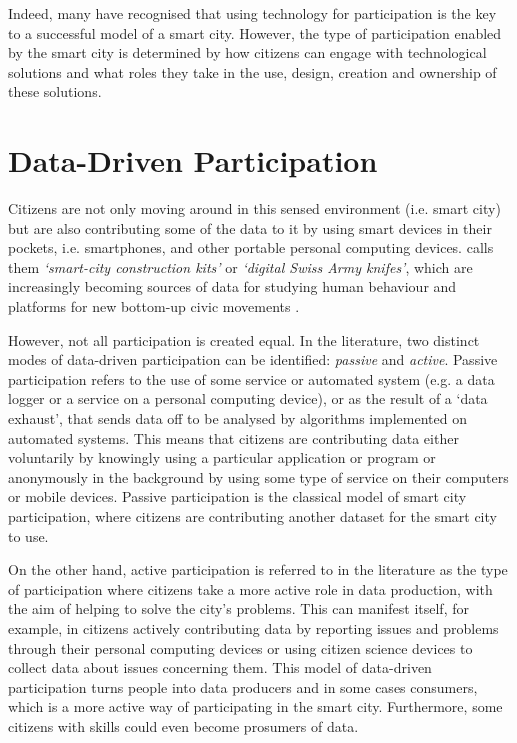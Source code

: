 Indeed, many have recognised \citep{saunders_rethinking_2015,rudolf_giffinge_smart_2007} that using technology for participation is the key to a successful model of a smart city. However, the type of participation enabled by the smart city is determined by how citizens can engage with technological solutions and what roles they take in the use, design, creation and ownership of these solutions.

\section{Data-Driven Participation}
\label{data-driven-participation}
Citizens are not only moving around in this sensed environment (i.e. smart city) but are also contributing some of the data to it by using smart devices in their pockets, i.e. smartphones, and other portable personal computing devices. \citet{townsend_smart_2013} calls them \textit{`smart-city construction kits'} or \textit{`digital Swiss Army knifes'}, which are increasingly becoming sources of data for studying human behaviour and platforms for new bottom-up civic movements \citep{obar_advocacy_2012,eltantawy_social_2011}.

However, not all participation is created equal. In the literature, two distinct modes of data-driven participation can be identified: \textit{passive} and \textit{active}. Passive participation refers to the use of some service or automated system (e.g. a data logger or a service on a personal computing device), or as the result of a `data exhaust', that sends data off to be analysed by algorithms implemented on automated systems. This means that citizens are contributing data either voluntarily by knowingly using a particular application or program or anonymously in the background by using some type of service on their computers or mobile devices. Passive participation is the classical model of smart city participation, where citizens are contributing another dataset for the smart city to use.

On the other hand, active participation is referred to in the literature as the type of participation where citizens take a more active role in data production, with the aim of helping to solve the city's problems. This can manifest itself, for example, in citizens actively contributing data by reporting issues and problems through their personal computing devices or using citizen science devices to collect data about issues concerning them. This model of data-driven participation turns people into data producers and in some cases consumers, which is a more active way of participating in the smart city. Furthermore, some citizens with skills could even become prosumers of data.

